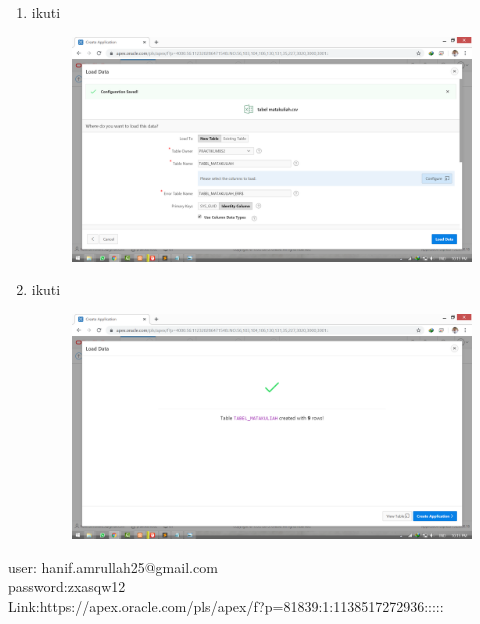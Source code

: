 \documentclass[11pt]{article}
\begin{document}
\begin{enumerate}
\item ikuti
\begin{figure}
        \centerline{\includegraphics[scale=0.1]{img/20loaddatatabel.png}}
        \caption{}
		\label{langkah21}
\end{figure}

\item ikuti
\begin{figure}
        \centerline{\includegraphics[scale=0.1]{img/21createtabel.png}}
        \caption{}
		\label{langkah22}
\end{figure}
	\end{enumerate}
	
\newpage	
user: hanif.amrullah25@gmail.com\\
password:zxasqw12\\
Link:https://apex.oracle.com/pls/apex/f?p=81839:1:1138517272936:::::\\
\end{document}
